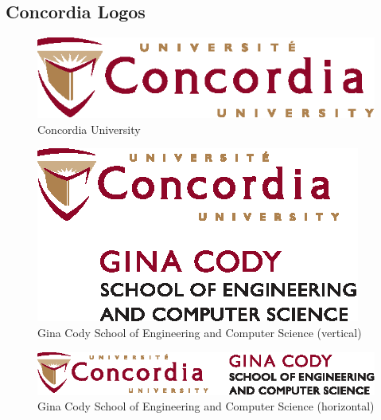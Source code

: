 \documentclass[letterpaper,12pt,onecolumn,final]{report}
\begin{document}
\begin{appendices}
\doublespacing

\chapter{Concordia Logos}
\label{chap:logos}
\begin{figure}[h!]
	\centering
	\includegraphics{logos/Concordia_University_logo}
	\caption{Concordia University}
\end{figure}
\vspace{2em}
\begin{figure}[h!]
	\centering
	\includegraphics{logos/Concordia_GinaCody_vertical}
	\caption{Gina Cody School of Engineering and Computer Science (vertical)}
\end{figure}
\vspace{2em}
\begin{figure}[h!]
	\centering
	\includegraphics{logos/Concordia_GinaCody_horizontal}
	\caption{Gina Cody School of Engineering and Computer Science (horizontal)}
\end{figure}

\end{appendices}
\end{document}
